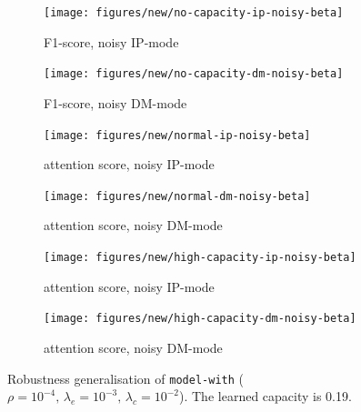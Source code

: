 \begin{figure}[!h]
\centering
\begin{subfigure}{.5\textwidth}
  \centering
  \texttt{[image: figures/new/no-capacity-ip-noisy-beta]}
  \caption{F1-score, noisy IP-mode}
  \label{fig:exp-9-a}
\end{subfigure}%
\begin{subfigure}{.5\textwidth}
  \centering
  \texttt{[image: figures/new/no-capacity-dm-noisy-beta]}
  \caption{F1-score, noisy DM-mode}
 \label{fig:exp-9-b} 
\end{subfigure}
\begin{subfigure}{.5\textwidth}
  \centering
  \texttt{[image: figures/new/normal-ip-noisy-beta]}
  \caption{attention score, noisy IP-mode}
   \label{fig:exp-9-c} 
\end{subfigure}%
\begin{subfigure}{.5\textwidth}
  \centering
  \texttt{[image: figures/new/normal-dm-noisy-beta]}
  \caption{attention score, noisy DM-mode}
   \label{fig:exp-9-d} 
\end{subfigure}
\begin{subfigure}{.5\textwidth}
  \centering
  \texttt{[image: figures/new/high-capacity-ip-noisy-beta]}
  \caption{attention score, noisy IP-mode}
   \label{fig:exp-9-e} 
\end{subfigure}%
\begin{subfigure}{.5\textwidth}
  \centering
  \texttt{[image: figures/new/high-capacity-dm-noisy-beta]}
  \caption{attention score, noisy DM-mode}
   \label{fig:exp-9-f} 
\end{subfigure}
\caption[Robustness generalisation]{Robustness generalisation of \texttt{model-with} ($\rho=10^{-4},\,\lambda_e=10^{-3},\,\lambda_c=10^{-2}$). The learned capacity is 0.19.}
\label{fig:exp-9}
\end{figure}


